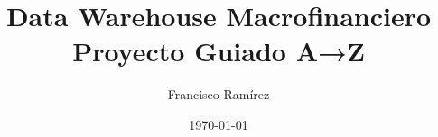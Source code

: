 \usepackage[utf8]{inputenc}
\usepackage[T1]{fontenc}
\usepackage[spanish]{babel}

\usepackage{graphicx}
\usepackage{booktabs}
\usepackage{hyperref}
\usepackage{xcolor}
\usepackage{listings}
\usepackage{amssymb}

\title{
Data Warehouse Macrofinanciero\\
Proyecto Guiado A→Z
}

\author{Francisco Ramírez}
\date{\today}